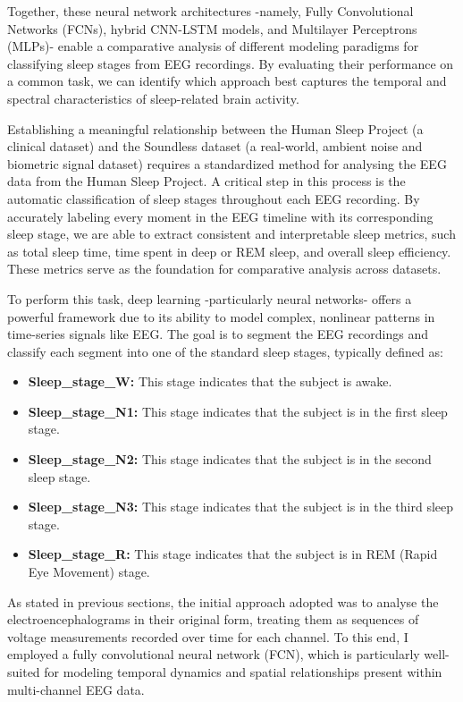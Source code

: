 Together, these neural network architectures -namely, Fully Convolutional Networks (FCNs), hybrid CNN-LSTM models, and Multilayer Perceptrons (MLPs)- enable a comparative analysis of different modeling paradigms for classifying sleep stages from EEG recordings. By evaluating their performance on a common task, we can identify which approach best captures the temporal and spectral characteristics of sleep-related brain activity.

Establishing a meaningful relationship between the Human Sleep Project (a clinical dataset) and the Soundless dataset (a real-world, ambient noise and biometric signal dataset) requires a standardized method for analysing the EEG data from the Human Sleep Project. A critical step in this process is the automatic classification of sleep stages throughout each EEG recording. By accurately labeling every moment in the EEG timeline with its corresponding sleep stage, we are able to extract consistent and interpretable sleep metrics, such as total sleep time, time spent in deep or REM sleep, and overall sleep efficiency. These metrics serve as the foundation for comparative analysis across datasets.

To perform this task, deep learning -particularly neural networks- offers a powerful framework due to its ability to model complex, nonlinear patterns in time-series signals like EEG. The goal is to segment the EEG recordings and classify each segment into one of the standard sleep stages, typically defined as:

\begin{itemize}
  \item \textbf{Sleep\_stage\_W:} This stage indicates that the subject is awake.
  \item \textbf{Sleep\_stage\_N1:} This stage indicates that the subject is in the first sleep stage.
  \item \textbf{Sleep\_stage\_N2:} This stage indicates that the subject is in the second sleep stage.
  \item \textbf{Sleep\_stage\_N3:} This stage indicates that the subject is in the third sleep stage.
  \item \textbf{Sleep\_stage\_R:} This stage indicates that the subject is in REM (Rapid Eye Movement) stage.
\end{itemize}

As stated in previous sections, the initial approach adopted was to analyse the electroencephalograms in their original form, treating them as sequences of voltage measurements recorded over time for each channel. To this end, I employed a fully convolutional neural network (FCN), which is particularly well-suited for modeling temporal dynamics and spatial relationships present within multi-channel EEG data.

